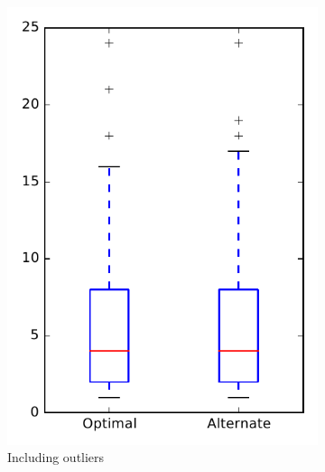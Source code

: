 
\begin{figure}
    \centering
    \begin{subfigure}{.4\textwidth}
        \centering
        \includegraphics[height=0.4\textheight]{figures/combo/dit_rq2_openjpa}
        \caption{Including outliers}\label{fig:combo:dit:rq2:openjpa_outlier}
    \end{subfigure}%
    \begin{subfigure}{.4\textwidth}
        \centering

\end{subfigure}
\end{figure}
